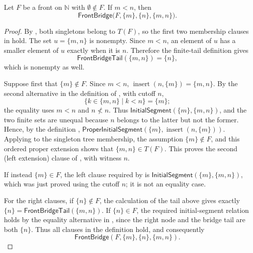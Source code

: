 \begin{lemma}
Let $F$ be a front on $\mathbb N$ with $\emptyset\notin F$.  If
$m<n$, then
\[
  \mathsf{FrontBridge}\bigl(F,\{m\},\{n\},\{m,n\}\bigr).
\]
\end{lemma}
\begin{proof}
By , both singletons belong to $T(F)$, so the
first two membership clauses in  hold.  The set
$u=\{m,n\}$ is nonempty.  Since $m<n$, an element of $u$ has a smaller
element of $u$ exactly when it is $n$.  Therefore the finite-tail
definition  gives
\[
 \mathsf{FrontBridgeTail}(\{m,n\})=\{n\},
\]
which is nonempty as well.

Suppose first that $\{m\}\notin F$.  Since $m<n$,
$\operatorname{insert}(n,\{m\})=\{m,n\}$.  By the second alternative in
the definition of , with cutoff $n$,
\[
 \{k\in\{m,n\}\mid k<n\}=\{m\};
\]
the equality uses $m<n$ and $n\not<n$.  Thus
$\mathsf{InitialSegment}(\{m\},\{m,n\})$, and the two finite sets are
unequal because $n$ belongs to the latter but not the former.  Hence,
by the definition ,
$\mathsf{ProperInitialSegment}(\{m\},\operatorname{insert}(n,\{m\}))$.
Applying  to the singleton tree
membership, the assumption $\{m\}\notin F$, and this ordered proper
extension shows that $\{m,n\}\in T(F)$.  This proves the second (left
extension) clause of , with witness $n$.

If instead $\{m\}\in F$, the left clause required by
 is \(\mathsf{InitialSegment}(\{m\},\{m,n\})\),
which was just proved using the cutoff $n$; it is not an equality case.

For the right clauses, if $\{n\}\notin F$, the calculation of the tail
above gives exactly
$\{n\}=\mathsf{FrontBridgeTail}(\{m,n\})$.  If $\{n\}\in F$, the
required initial-segment relation holds by the equality alternative in
, since the right node and the bridge tail are
both $\{n\}$.  Thus all clauses in the definition
 hold, and consequently
\[
\mathsf{FrontBridge}(F,\{m\},\{n\},\{m,n\}).
\]
\end{proof}
